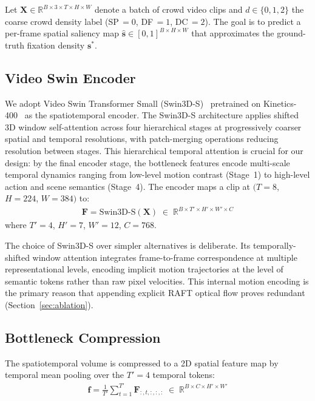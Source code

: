 \documentclass[twocolumn]{article}
\begin{document}
Let $\mathbf{X} \in \mathbb{R}^{B \times 3 \times T \times H \times W}$
denote a batch of crowd video clips and $d \in \{0, 1, 2\}$ the coarse
crowd density label (SP\,$=\!0$, DF\,$=\!1$, DC\,$=\!2$).  The goal is to
predict a per-frame spatial saliency map
$\hat{\mathbf{s}} \in [0,1]^{B \times H \times W}$ that approximates the
ground-truth fixation density $\mathbf{s}^{*}$.

\subsection{Video Swin Encoder}

We adopt Video Swin Transformer Small (Swin3D-S)~\citep{video_swin}
pretrained on Kinetics-400~\citep{kinetics} as the spatiotemporal encoder.
The Swin3D-S architecture applies shifted 3D window self-attention across
four hierarchical stages at progressively coarser spatial and temporal
resolutions, with patch-merging operations reducing resolution between stages.
This hierarchical temporal attention is crucial for our design: by the final
encoder stage, the bottleneck features encode multi-scale temporal dynamics
ranging from low-level motion contrast (Stage~1) to high-level action and
scene semantics (Stage~4).  The encoder maps a clip at $(T\!=\!8$,
$H\!=\!224$, $W\!=\!384)$ to:
\begin{align}
  \mathbf{F} = \mathrm{Swin3D\text{-}S}(\mathbf{X})
  \;\in\; \mathbb{R}^{B \times T' \times H' \times W' \times C}
  \label{eq:encoder}
\end{align}
where $T'\!=\!4$, $H'\!=\!7$, $W'\!=\!12$, $C\!=\!768$.

The choice of Swin3D-S over simpler alternatives is deliberate.  Its
temporally-shifted window attention integrates frame-to-frame correspondence
at multiple representational levels, encoding implicit motion trajectories
at the level of semantic tokens rather than raw pixel velocities.  This
internal motion encoding is the primary reason that appending explicit RAFT
optical flow proves redundant (Section~\ref{sec:ablation}).

\subsection{Bottleneck Compression}

The spatiotemporal volume is compressed to a 2D spatial feature map by
temporal mean pooling over the $T'\!=\!4$ temporal tokens:
\begin{align}
  \mathbf{f} = \frac{1}{T'}\sum_{t=1}^{T'} \mathbf{F}_{:,t,:,:,:}
  \;\in\; \mathbb{R}^{B \times C \times H' \times W'}
  \label{eq:pool}
\end{align}
\end{document}
